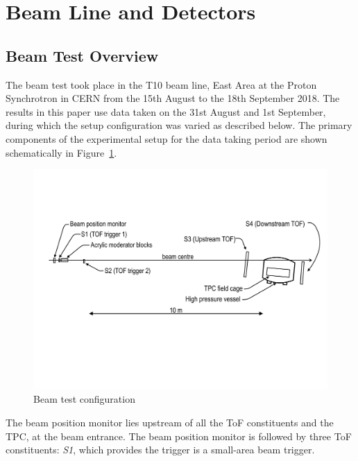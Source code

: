 \section{Beam Line and Detectors}
\label{hptpcPaper:sec:Methods}

\subsection{Beam Test Overview}
The beam test took place in the T10 beam line, East Area at the Proton Synchrotron in CERN from the 15th August to the 18th September 2018.
The results in this paper use data taken on the 31st August and 1st September, during which the setup configuration was varied as described below.
The primary components of the  experimental setup for the data taking period are shown schematically in Figure~\ref{fig:setup}.
\begin{figure}
  \includegraphics[width=1.0\linewidth]{files/Figures/T10Diagram.pdf}
  \caption{Beam test configuration}
  \label{fig:setup}
\end{figure}
The beam position monitor lies upstream of all the ToF constituents and the TPC, at the beam entrance. 
The beam position monitor is followed by three ToF constituents: \textit{S1}, which provides the trigger is a small-area beam trigger.
